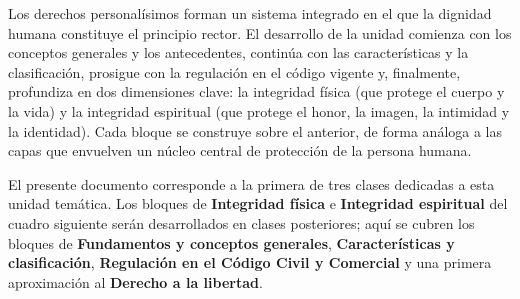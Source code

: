 \documentclass[12pt,oneside]{book}
\begin{document}
Los derechos personalísimos forman un sistema integrado en el que la dignidad humana constituye el principio rector. El desarrollo de la unidad comienza con los conceptos generales y los antecedentes, continúa con las características y la clasificación, prosigue con la regulación en el código vigente y, finalmente, profundiza en dos dimensiones clave: la integridad física (que protege el cuerpo y la vida) y la integridad espiritual (que protege el honor, la imagen, la intimidad y la identidad). Cada bloque se construye sobre el anterior, de forma análoga a las capas que envuelven un núcleo central de protección de la persona humana.

\begin{note}
El presente documento corresponde a la primera de tres clases dedicadas a esta unidad temática. Los bloques de \textbf{Integridad física} e \textbf{Integridad espiritual} del cuadro siguiente serán desarrollados en clases posteriores; aquí se cubren los bloques de \textbf{Fundamentos y conceptos generales}, \textbf{Características y clasificación}, \textbf{Regulación en el Código Civil y Comercial} y una primera aproximación al \textbf{Derecho a la libertad}.
\end{note}
\end{document}
